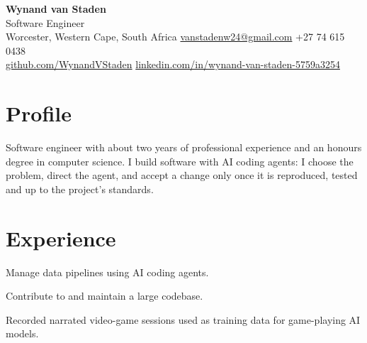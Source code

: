 \newcommand{\degree}[3]{\textbf{#1}, \textit{#2}\hfill #3\par}

\newcommand{\gap}{\vspace{4pt}}
\newcommand{\sep}{\enspace\textbar\enspace}



\begin{center}
  {\Huge\bfseries\color{accent} Wynand van Staden}\\[4pt]
  {\large Software Engineer}\\[5pt]
  Worcester, Western Cape, South Africa \sep
  \href{mailto:vanstadenw24@gmail.com}{vanstadenw24@gmail.com} \sep
  +27 74 615 0438\\[2pt]
  {\small
  \href{https://github.com/WynandVStaden}{github.com/WynandVStaden} \sep
  \href{https://www.linkedin.com/in/wynand-van-staden-5759a3254}{linkedin.com/in/wynand-van-staden-5759a3254}}
\end{center}

\section{Profile}
Software engineer with about two years of professional experience and an honours degree in
computer science. I build software with AI coding agents: I choose the problem, direct the agent,
and accept a change only once it is reproduced, tested and up to the project's standards.

\section{Experience}

\begin{bullets}
  \item Manage data pipelines using AI coding agents.
  \item Contribute to and maintain a large codebase.
\end{bullets}
\gap

\begin{bullets}
  \item Recorded narrated video-game sessions used as training data for game-playing AI models.
\end{bullets}
\gap

